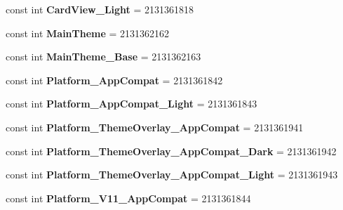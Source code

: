 \begin{DoxyCompactItemize}
const int {\bfseries Card\+View\+\_\+\+Light} = 2131361818
\item 
\mbox{\label{class_sample_app_1_1_droid_1_1_resource_1_1_style_adac998140b094607ed67bb6e42e515ad}} 
const int {\bfseries Main\+Theme} = 2131362162
\item 
\mbox{\label{class_sample_app_1_1_droid_1_1_resource_1_1_style_afb32b77b02bf4cb733ef40e870ad91af}} 
const int {\bfseries Main\+Theme\+\_\+\+Base} = 2131362163
\item 
\mbox{\label{class_sample_app_1_1_droid_1_1_resource_1_1_style_aa84acf49eeb860734da5837223cdfba5}} 
const int {\bfseries Platform\+\_\+\+App\+Compat} = 2131361842
\item 
\mbox{\label{class_sample_app_1_1_droid_1_1_resource_1_1_style_a7d8037c8a5182852b19d049edf7d057a}} 
const int {\bfseries Platform\+\_\+\+App\+Compat\+\_\+\+Light} = 2131361843
\item 
\mbox{\label{class_sample_app_1_1_droid_1_1_resource_1_1_style_a65e2a4f4512deb8bd11a76de087471a7}} 
const int {\bfseries Platform\+\_\+\+Theme\+Overlay\+\_\+\+App\+Compat} = 2131361941
\item 
\mbox{\label{class_sample_app_1_1_droid_1_1_resource_1_1_style_a8638fa927b84d94afbbeb7e7f6654796}} 
const int {\bfseries Platform\+\_\+\+Theme\+Overlay\+\_\+\+App\+Compat\+\_\+\+Dark} = 2131361942
\item 
\mbox{\label{class_sample_app_1_1_droid_1_1_resource_1_1_style_a757f6c4e2b781fb393d5533097302a79}} 
const int {\bfseries Platform\+\_\+\+Theme\+Overlay\+\_\+\+App\+Compat\+\_\+\+Light} = 2131361943
\item 
\mbox{\label{class_sample_app_1_1_droid_1_1_resource_1_1_style_a55acb3ba7796771e3d9cf380fdfcfecc}} 
const int {\bfseries Platform\+\_\+\+V11\+\_\+\+App\+Compat} = 2131361844

\end{DoxyCompactItemize}
